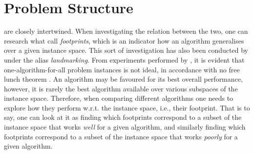 
\chapter{Problem Structure}\label{ch:problemstructure} 


 are closely 
intertwined. When investigating the relation between the two, one can research 
what \citet{Corne10} call \emph{footprints}, which is an indicator how an 
algorithm generalises over a given instance space. This sort of investigation 
has also been conducted by \citet{Pfahringer00} under the alias 
\emph{landmarking}. 
From experiments performed by \citeauthor{Corne10}, it is evident that 
one-algorithm-for-all problem instances is not ideal, in accordance with no 
free lunch theorem \citep{Wolpert97nofree}. An algorithm may be favoured for 
its best overall performance, however, it is rarely the best algorithm 
available over various subspaces of the instance space.
Therefore, when comparing different algorithms one needs to explore how they perform w.r.t. the instance space, i.e., their footprint. That is to say, one can look at it as finding which footprints correspond to a subset of the instance space that works \emph{well} for a given algorithm, and similarly finding which footprints correspond to a subset of the instance space that works \emph{poorly} for a given algorithm. 

